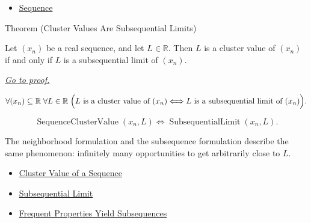 \begin{remark*}[Dependencies]\hfill
\begin{itemize}
  \item \hyperref[def:sequence]{Sequence}
\end{itemize}
\end{remark*}


\begin{theorembox}{Theorem (Cluster Values Are Subsequential Limits)}
\begin{theorem}
\label{thm:cluster-values-are-subsequential-limits}
Let $(x_n)$ be a real sequence, and let $L\in\mathbb{R}$. Then $L$ is a
cluster value of $(x_n)$ if and only if $L$ is a subsequential limit of
$(x_n)$.

\smallskip
\noindent
\hyperref[prf:cluster-values-are-subsequential-limits]{\textit{Go to proof.}}
\end{theorem}
\end{theorembox}

\begin{remark*}
\[
\forall (x_n)\subseteq\mathbb{R}\;\forall L\in\mathbb{R}\;
\Bigl(
L\text{ is a cluster value of }(x_n)
\Longleftrightarrow
L\text{ is a subsequential limit of }(x_n)
\Bigr).
\]
\end{remark*}

\begin{remark*}
\[
\operatorname{SequenceClusterValue}(x_n,L)
\Longleftrightarrow
\operatorname{SubsequentialLimit}(x_n,L).
\]
\end{remark*}

\begin{remark*}[Interpretation]
The neighborhood formulation and the subsequence formulation describe the
same phenomenon: infinitely many opportunities to get arbitrarily close to
$L$.
\end{remark*}

\begin{remark*}[Dependencies]\hfill
\begin{itemize}
  \item \hyperref[def:cluster-value-sequence]{Cluster Value of a Sequence}
  \item \hyperref[def:subsequential-limit]{Subsequential Limit}
  \item \hyperref[thm:frequent-properties-yield-subsequences]{Frequent Properties Yield Subsequences}
\end{itemize}
\end{remark*}

